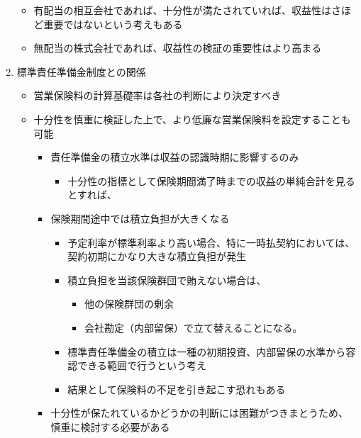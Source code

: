 \documentclass[report,gutter=10mm,fore-edge=10mm,uplatex,dvipdfmx]{jlreq}
\begin{document}
\begin{enumerate}
  \begin{itemize}
  \tightlist
  \item
    有配当の相互会社であれば、十分性が満たされていれば、収益性はさほど重要ではないという考えもある
  \item
    無配当の株式会社であれば、収益性の検証の重要性はより高まる
  \end{itemize}
\item
  標準責任準備金制度との関係

  \begin{itemize}
  \tightlist
  \item
    営業保険料の計算基礎率は各社の判断により決定すべき
  \item
    十分性を慎重に検証した上で、より低廉な営業保険料を設定することも可能

    \begin{itemize}
    \tightlist
    \item
      責任準備金の積立水準は収益の認識時期に影響するのみ

      \begin{itemize}
      \tightlist
      \item
        十分性の指標として保険期間満了時までの収益の単純合計を見るとすれば、
      \end{itemize}
    \item
      保険期間途中では積立負担が大きくなる

      \begin{itemize}
      \tightlist
      \item
        予定利率が標準利率より高い場合、特に一時払契約においては、契約初期にかなり大きな積立負担が発生
      \item
        積立負担を当該保険群団で賄えない場合は、

        \begin{itemize}
        \tightlist
        \item
          他の保険群団の剰余
        \item
          会社勘定（内部留保）で立て替えることになる。
        \end{itemize}
      \item
        標準責任準備金の積立は一種の初期投資、内部留保の水準から容認できる範囲で行うという考え
      \item
        結果として保険料の不足を引き起こす恐れもある
      \end{itemize}
    \item
      十分性が保たれているかどうかの判断には困難がつきまとうため、慎重に検討する必要がある
    \end{itemize}
  \end{itemize}
\end{enumerate}
\end{document}
